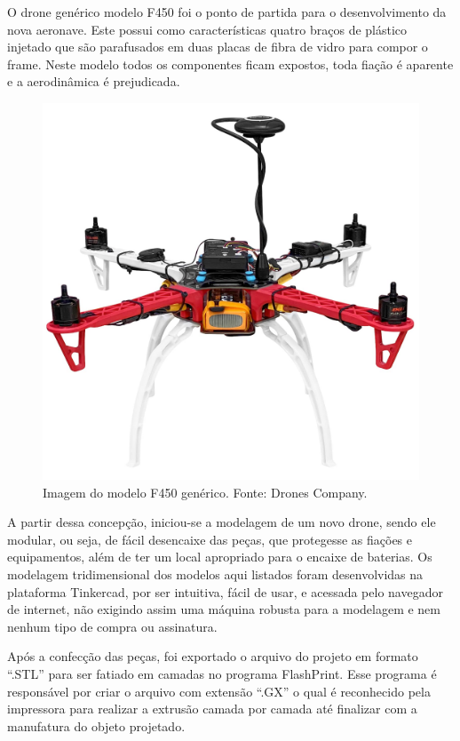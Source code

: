 \documentclass[conference]{IEEEtran}
\begin{document}
O drone genérico modelo F450 foi o ponto de partida para o desenvolvimento da nova aeronave. Este possui como características quatro braços de plástico injetado que são parafusados em duas placas de fibra de vidro para compor o frame. Neste modelo todos os componentes ficam expostos, toda fiação é aparente e a aerodinâmica é prejudicada.

\begin{figure}[!htb]
    \centering
    \includegraphics[scale=0.07]{img/f450.jpg} 
    \caption{Imagem do modelo F450 genérico. Fonte: Drones Company.}
    \label{fig:my_label}
\end{figure}

A partir dessa concepção, iniciou-se a modelagem de um novo drone, sendo ele modular, ou seja, de fácil desencaixe das peças, que protegesse as fiações e equipamentos, além de ter um local apropriado para o encaixe de baterias. Os modelagem tridimensional dos modelos aqui listados foram desenvolvidas na plataforma Tinkercad, por ser intuitiva, fácil de usar, e acessada pelo navegador de internet, não exigindo assim uma máquina robusta para a modelagem e nem nenhum tipo de compra ou assinatura.

Após a confecção das peças, foi exportado o arquivo do projeto em formato “.STL” para ser fatiado em camadas no programa FlashPrint. Esse programa é responsável por criar o arquivo com extensão “.GX” o qual é reconhecido pela impressora para realizar a extrusão camada por camada até finalizar com a manufatura do objeto projetado.
\end{document}
